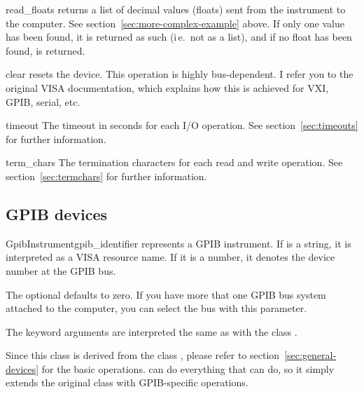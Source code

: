 \documentclass{howto}
\begin{document}
\begin{methoddesc}{read_floats}{}
  returns a list of decimal values (floats) sent from the instrument to the
  computer.  See section~\ref{sec:more-complex-example} above.  If only one
  value has been found, it is returned as such (i\,e.\ not as a list), and if
  no float has been found,  is returned.
\end{methoddesc}

\begin{methoddesc}{clear}{}
  resets the device.  This operation is highly bus-dependent.  I refer you to
  the original VISA documentation, which explains how this is achieved for VXI,
  GPIB, serial, etc.
\end{methoddesc}

\begin{memberdesc}{timeout}
  The timeout in seconds for each I/O operation.  See
  section~\ref{sec:timeouts} for further information.
\end{memberdesc}

\begin{memberdesc}{term_chars}
  The termination characters for each read and write operation.  See
  section~\ref{sec:termchars} for further information.
\end{memberdesc}


\subsection{GPIB devices}
\label{sec:gpib-devices}

\begin{classdesc}{GpibInstrument}{gpib_identifier}
  represents a GPIB instrument.  If  is a string, it is
  interpreted as a VISA resource name.  If it is a number, it denotes the
  device number at the GPIB bus.

  The optional  defaults to zero.  If you have more that one
  GPIB bus system attached to the computer, you can select the bus with this
  parameter.

  The keyword arguments are interpreted the same as with the class
  .
\end{classdesc}

\begin{notice}
  Since this class is derived from the class , please refer
  to section~\ref{sec:general-devices} for the basic operations.
   can do everything that  can do, so
  it simply extends the original class with GPIB-specific operations.
\end{notice}
\end{document}
